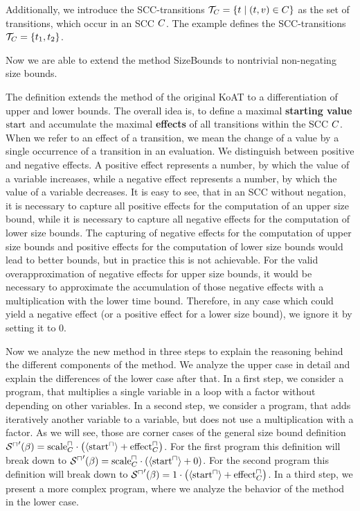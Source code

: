 Additionally, we introduce the SCC-transitions $\mathcal{T}_C = \lbrace  t \mid (t,v) \in C \rbrace$ as the set of transitions, which occur in an SCC $C$.
The example defines the SCC-transitions $\mathcal{T}_C = \lbrace t_1, t_2 \rbrace$.

Now we are able to extend the method SizeBounds to nontrivial non-negating size bounds.



The definition extends the method of the original KoAT to a differentiation of upper and lower bounds.
The overall idea is, to define a maximal \textbf{starting value} $\text{start}$ and accumulate the maximal \textbf{effects} of all transitions within the SCC $C$.
When we refer to an effect of a transition, we mean the change of a value by a single occurrence of a transition in an evaluation.
We distinguish between positive and negative effects.
A positive effect represents a number, by which the value of a variable increases, while a negative effect represents a number, by which the value of a variable decreases.
It is easy to see, that in an SCC without negation, it is necessary to capture all positive effects for the computation of an upper size bound, while it is necessary to capture all negative effects for the computation of lower size bounds.
The capturing of negative effects for the computation of upper size bounds and positive effects for the computation of lower size bounds would lead to better bounds, but in practice this is not achievable.
For the valid overapproximation of negative effects for upper size bounds, it would be necessary to approximate the accumulation of those negative effects with a multiplication with the lower time bound.
Therefore, in any case which could yield a negative effect (or a positive effect for a lower size bound), we ignore it by setting it to $0$.

Now we analyze the new method in three steps to explain the reasoning behind the different components of the method.
We analyze the upper case in detail and explain the differences of the lower case after that.
In a first step, we consider a program, that multiplies a single variable in a loop with a factor without depending on other variables.
In a second step, we consider a program, that adds iteratively another variable to a variable, but does not use a multiplication with a factor.
As we will see, those are corner cases of the general size bound definition ${\mathcal{S}^\sqcap}'(\beta) = \text{scale}^\sqcap_C \cdot \left( \langle\text{start}^\sqcap\rangle + \text{effect}^\sqcap_C \right)$.
For the first program this definition will break down to ${\mathcal{S}^\sqcap}'(\beta) = \text{scale}^\sqcap_C \cdot \left( \langle\text{start}^\sqcap\rangle + 0 \right)$.
For the second program this definition will break down to ${\mathcal{S}^\sqcap}'(\beta) = 1 \cdot \left( \langle\text{start}^\sqcap\rangle + \text{effect}^\sqcap_C \right)$.
In a third step, we present a more complex program, where we analyze the behavior of the method in the lower case.

